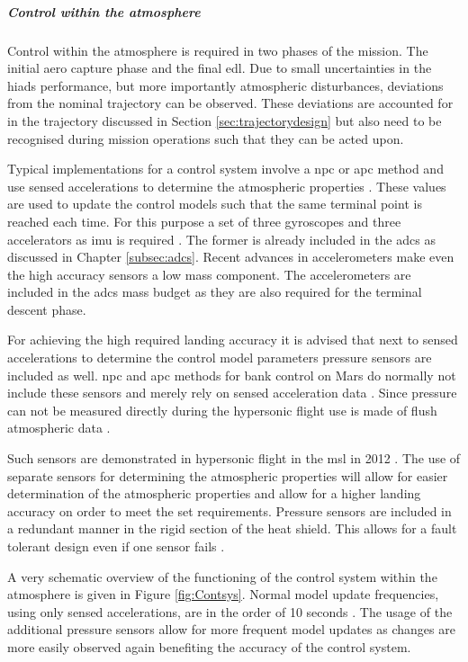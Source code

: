\subparagraph{Control within the atmosphere}

Control within the atmosphere is required in two phases of the mission. The initial aero capture phase and the final \gls{edl}. Due to small uncertainties in the \glspl{hiad} performance, but more importantly atmospheric disturbances, deviations from the nominal trajectory can be observed. These deviations are accounted for in the trajectory discussed in Section \ref{sec:trajectorydesign} but also need to be recognised during mission operations such that they can be acted upon. 

Typical implementations for a control system involve a \gls{npc} or \gls{apc} method and use sensed accelerations to determine the atmospheric properties \cite{Davis2010}. These values are used to update the control models such that the same terminal point is reached each time. For this purpose a set of three gyroscopes and three accelerators as \gls{imu} is required \cite{Dutta2013}. The former is already included in the \gls{adcs} as discussed in Chapter \ref{subsec:adcs}. Recent advances in accelerometers make even the high accuracy sensors a low mass component. The accelerometers are included in the \gls{adcs} mass budget as they are also required for the terminal descent phase. 

For achieving the high required landing accuracy it is advised that next to sensed accelerations to determine the control model parameters pressure sensors are included as well.  \gls{npc} and \gls{apc} methods for bank control on Mars do normally not include these sensors and merely rely on sensed acceleration data \cite{Lu2007, Davis2010}. Since pressure can not be measured directly during the hypersonic flight use is made of flush atmospheric data \cite{Dutta2013}. 
 
Such sensors are demonstrated in hypersonic flight in the \gls{msl} in 2012 \cite{Dutta2013}. The use of separate sensors for determining the atmospheric properties will allow for easier determination of the atmospheric properties and allow for a higher landing accuracy on order to meet the set requirements.
Pressure sensors are included in a redundant manner in the rigid section of the heat shield. This allows for a fault tolerant design even if one sensor fails \cite{Whitmore1995}. 

A very schematic overview of the functioning of the control system within the atmosphere is given in Figure \ref{fig:Contsys}. Normal model update frequencies, using only sensed accelerations, are in the order of 10 seconds \cite{Davis2010}. The usage of the additional pressure sensors allow for more frequent model updates as changes are more easily observed again benefiting the accuracy of the control system.

